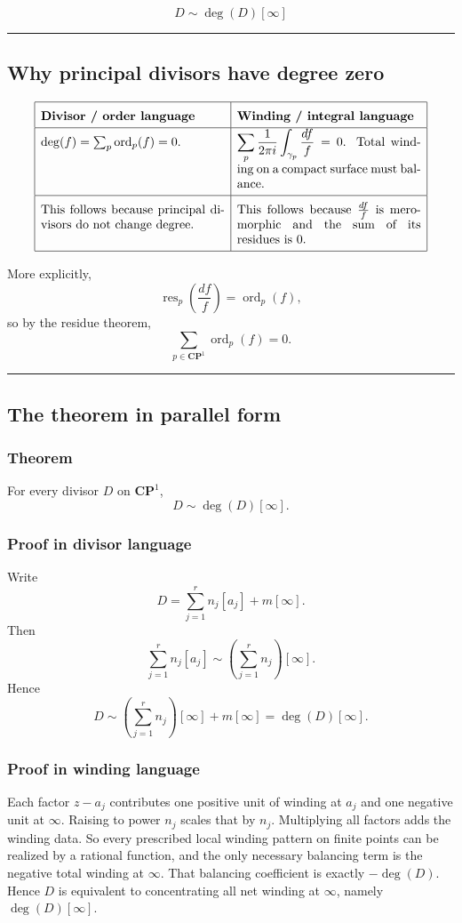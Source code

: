 \documentclass[11pt]{article}
\begin{document}
	\bigskip
	
	\[
	\boxed{D\sim \deg(D)[\infty]}
	\]
	
	\bigskip
	\hrule
	\bigskip
	
	\subsection*{Why principal divisors have degree zero}
	
	\[
	\renewcommand{\arraystretch}{1.7}
	\begin{array}{|p{0.43\textwidth}|p{0.43\textwidth}|}
		\hline
		\textbf{Divisor / order language} & \textbf{Winding / integral language} \\
		\hline
		\(\deg(f)=\sum_p \operatorname{ord}_p(f)=0\). &
		\(\displaystyle \sum_p \frac{1}{2\pi i}\int_{\gamma_p}\frac{df}{f}=0\). Total winding on a compact surface must balance. \\
		\hline
		This follows because principal divisors do not change degree. &
		This follows because \(\frac{df}{f}\) is meromorphic and the sum of its residues is \(0\). \\
		\hline
	\end{array}
	\]
	
	More explicitly,
	\[
	\operatorname{res}_p\!\left(\frac{df}{f}\right)=\operatorname{ord}_p(f),
	\]
	so by the residue theorem,
	\[
	\sum_{p\in \mathbf{CP}^1}\operatorname{ord}_p(f)=0.
	\]
	
	\bigskip
	\hrule
	\bigskip
	
	\subsection*{The theorem in parallel form}
	
	\subsubsection*{Theorem}
	For every divisor \(D\) on \(\mathbf{CP}^1\),
	\[
	D\sim \deg(D)[\infty].
	\]
	
	\subsubsection*{Proof in divisor language}
	Write
	\[
	D=\sum_{j=1}^r n_j[a_j]+m[\infty].
	\]
	Then
	\[
	\sum_{j=1}^r n_j[a_j]\sim \left(\sum_{j=1}^r n_j\right)[\infty].
	\]
	Hence
	\[
	D\sim \left(\sum_{j=1}^r n_j\right)[\infty]+m[\infty]
	=\deg(D)[\infty].
	\]
	
	\subsubsection*{Proof in winding language}
	Each factor \(z-a_j\) contributes one positive unit of winding at \(a_j\) and one negative unit at \(\infty\). Raising to power \(n_j\) scales that by \(n_j\). Multiplying all factors adds the winding data. So every prescribed local winding pattern on finite points can be realized by a rational function, and the only necessary balancing term is the negative total winding at \(\infty\). That balancing coefficient is exactly \(-\deg(D)\). Hence \(D\) is equivalent to concentrating all net winding at \(\infty\), namely \(\deg(D)[\infty]\).
	
\end{document}
